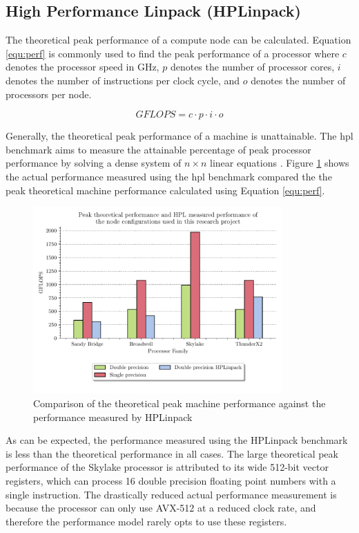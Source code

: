 \documentclass[a4paper,11pt]{report}
\begin{document}
\subsection{High Performance Linpack (HPLinpack)}
The theoretical peak performance of a compute node can be calculated. Equation \ref{equ:perf} is commonly used to find the peak performance of a processor where $c$ denotes the processor speed in GHz, $p$ denotes the number of processor cores, $i$ denotes the number of instructions per clock cycle, and $o$ denotes the number of processors per node. 

\begin{equation}
GFLOPS = c \cdot p \cdot i \cdot o 
\label{equ:perf}
\end{equation}
\par
Generally, the theoretical peak performance of a machine is unattainable. The \gls{hpl} benchmark aims to measure the attainable percentage of peak processor performance by solving a dense system of $n\times n$ linear equations \cite{dongarra2008linpack}. Figure \ref{fig:hpl} shows the actual performance measured using the \gls{hpl} benchmark compared the the peak theoretical machine performance calculated using Equation \ref{equ:perf}. 
\par
\begin{figure}[htbp]
\begin{center}
\includegraphics[width=0.85\textwidth]{img/hpl.pdf}
\caption[High performance Linpack benchmark]{Comparison of the theoretical peak machine performance against the performance measured by HPLinpack }
\label{fig:hpl}
\end{center}
\end{figure}
\par
As can be expected, the performance measured using the HPLinpack benchmark is less than the theoretical performance in all cases. The large theoretical peak performance of the Skylake processor is attributed to its wide 512-bit vector registers, which can process 16 double precision floating point numbers with a single instruction. The drastically reduced actual performance measurement is because the processor can only use AVX-512 at a reduced clock rate, and therefore the performance model rarely opts to use these registers. 
\end{document}
